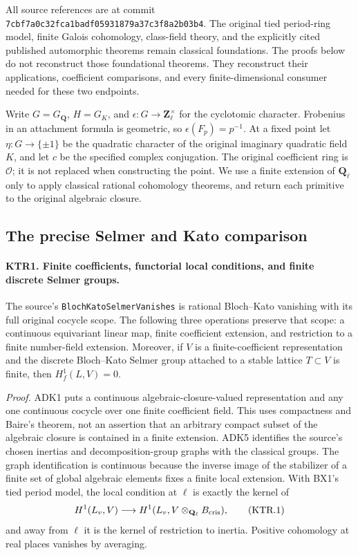 \documentclass[11pt,a4paper]{article}
\numberwithin{equation}{section}
\theoremstyle{remark}\newtheorem{remark}[theorem]{Remark}
\begin{document}
All source references are at commit
\texttt{7cbf7a0c32fca1badf05931879a37c3f8a2b03b4}.
The original tied period-ring model, finite Galois cohomology,
class-field theory, and the explicitly cited published automorphic
theorems remain classical foundations.  The proofs below do not
reconstruct those foundational theorems.  They reconstruct their
applications, coefficient comparisons, and every finite-dimensional
consumer needed for these two endpoints.

Write \(G=G_{\mathbf Q}\), \(H=G_K\), and
\(\epsilon:G\to\mathbf Z_\ell^\times\) for the cyclotomic
character.  Frobenius in an attachment formula is geometric, so
\(\epsilon(F_p)=p^{-1}\).  At a fixed point let
\(\eta:G\to\{\pm1\}\) be the quadratic character of the
original imaginary quadratic field \(K\), and let \(c\) be the
specified complex conjugation.  The original coefficient ring is
\(\mathcal O\); it is not replaced when constructing the point.
We use a finite extension of \(\mathbf Q_\ell\) only to apply
classical rational cohomology theorems, and return each primitive
to the original algebraic closure.

\subsection{The precise Selmer and Kato comparison}

\paragraph{KTR1. Finite coefficients, functorial local conditions, and finite discrete Selmer groups.}
\label{claim:KTR1}
The source's \texttt{Bloch\allowbreak Kato\allowbreak Selmer\allowbreak Vanishes} is rational
Bloch--Kato vanishing with its full original cocycle scope.  The
following three operations preserve that scope: a continuous
equivariant linear map, finite coefficient extension, and restriction
to a finite number-field extension.  Moreover, if \(V\) is a
finite-coefficient representation and the discrete Bloch--Kato
Selmer group attached to a stable lattice \(T\subset V\) is
finite, then \(H^1_f(L,V)=0\).

\emph{Proof.}
ADK1 puts a continuous algebraic-closure-valued representation and
any one continuous cocycle over one finite coefficient field.
This uses compactness and Baire's theorem, not an assertion that
an arbitrary compact subset of the algebraic closure is contained
in a finite extension.  ADK5 identifies the source's chosen
inertias and decomposition-group graphs with the classical groups.
The graph identification is continuous because the inverse image
of the stabilizer of a finite set of global algebraic elements
fixes a finite local extension.  With BX1's tied period model, the
local condition at \(\ell\) is exactly the kernel of
\[
 H^1(L_v,V)\longrightarrow
 H^1(L_v,V\otimes_{\mathbf Q_\ell}B_{\rm cris}),
 \tag{KTR.1}
\]
and away from \(\ell\) it is the kernel of restriction to inertia.
Positive cohomology at real places vanishes by averaging.
\end{document}
